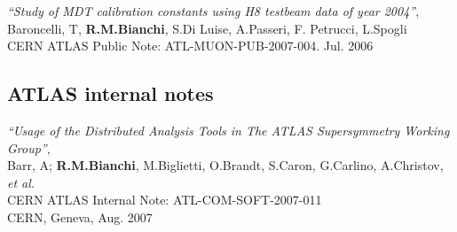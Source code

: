 \documentclass[10pt, a4paper]{article}
\newcommand{\years}[1]{\marginpar{\footnotesize #1}}
\begin{document}
\textit{``Study of MDT calibration constants using H8 testbeam data of year 2004''},\\
Baroncelli, T, \textbf{R.M.Bianchi}, S.Di Luise, A.Passeri, F. Petrucci, L.Spogli\\
CERN ATLAS Public Note: ATL-MUON-PUB-2007-004. Jul. 2006\\


\subsection{ATLAS internal notes}

\textit{``Usage of the Distributed Analysis Tools in The ATLAS Supersymmetry Working Group''},\\
Barr, A; \textbf{R.M.Bianchi},  M.Biglietti, O.Brandt, S.Caron, G.Carlino, A.Christov, \textit{et al.}\\
CERN ATLAS Internal Note:    ATL-COM-SOFT-2007-011\\
CERN, Geneva, Aug. 2007\\



\end{document}
